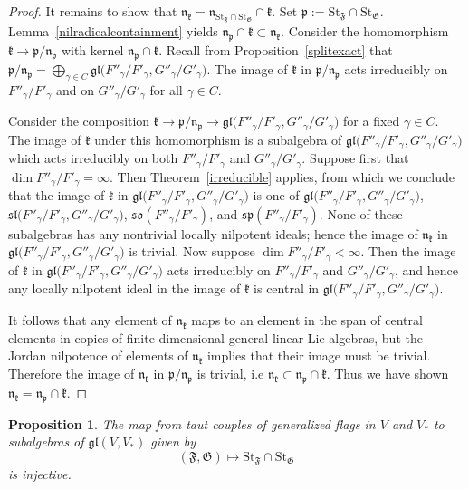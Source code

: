 \documentclass{article}
\newcommand {\St} {\mathrm{St}}
\def\gl{\mathfrak {gl}}
\def\n{\mathfrak {n}}
\def\p{\mathfrak {p}}
\def\sl{\mathfrak{sl}}
\def\so{\mathfrak{so}}
\def\sp{\mathfrak{sp}}
\def\k{\mathfrak{k}}
\def\F{\mathfrak{F}}
\def\G{\mathfrak{G}}
\newtheorem{prop}[thm]{Proposition}
\begin{document}
\begin{proof}
It remains to show that $\n_\k = \n_{\St_\F \cap \St_\G} \cap \k$.
Set $\p := \St_\F \cap \St_\G$.   Lemma~\ref{nilradicalcontainment} yields $\n_\p \cap \k \subset \n_\k$.  Consider the homomorphism $\k \rightarrow {\p} / {\n_\p}$ with kernel $\n_ \p \cap \k$.  Recall from Proposition~\ref{splitexact} that ${\p} / {\n_\p} = \bigoplus_{\gamma \in C} \gl\big({F''_\gamma} / {F'_\gamma} , {G''_\gamma} / {G'_\gamma}\big)$.  The image of $\k$ in ${\p} / {\n_\p}$ acts irreducibly on ${F''_\gamma} / {F'_\gamma}$ and on ${G''_\gamma} / {G'_\gamma}$ for all $\gamma \in C$.  

Consider the composition $\k \rightarrow {\p} / {\n_\p} \rightarrow \gl\big({F''_\gamma} / {F'_\gamma} , {G''_\gamma} / {G'_\gamma}\big)$ for a fixed $\gamma \in C$.  The image of $\k$ under this homomorphism  is a subalgebra of $ \gl\big({F''_\gamma} / {F'_\gamma} , {G''_\gamma} / {G'_\gamma}\big)$ which acts irreducibly on both ${F''_\gamma} / {F'_\gamma}$ and ${G''_\gamma} / {G'_\gamma}$.  
Suppose first that $\dim {F''_\gamma} / {F'_\gamma} = \infty$.  Then Theorem~\ref{irreducible} applies, from which we conclude that the image of $\k$ in $\gl\big({F''_\gamma} / {F'_\gamma} , {G''_\gamma} / {G'_\gamma}\big)$ is one of $\gl\big({F''_\gamma} / {F'_\gamma} , {G''_\gamma} / {G'_\gamma}\big)$, $\sl \big({F''_\gamma} / {F'_\gamma} , {G''_\gamma} / {G'_\gamma} \big)$, $\so({F''_\gamma} / {F'_\gamma})$, and $\sp({F''_\gamma} / {F'_\gamma})$.  None of these subalgebras has any nontrivial locally nilpotent ideals; hence the image of $\n_\k$ in $\gl\big({F''_\gamma} / {F'_\gamma} , {G''_\gamma} / {G'_\gamma}\big)$ is trivial.  Now suppose $\dim {F''_\gamma} / {F'_\gamma} < \infty$.  Then the image of $\k$ in $\gl\big({F''_\gamma} / {F'_\gamma} , {G''_\gamma} / {G'_\gamma}\big)$  acts irreducibly on ${F''_\gamma} / {F'_\gamma}$ and ${G''_\gamma} / {G'_\gamma}$, and hence any locally nilpotent ideal in the image of $\k$ is central in $\gl\big({F''_\gamma} / {F'_\gamma} , {G''_\gamma} / {G'_\gamma}\big)$.  

It follows that any element of $\n_\k$ maps to an element in the span of central elements in copies of finite-dimensional general linear Lie algebras, but the Jordan nilpotence of elements of $\n_\k$ implies that their image must be trivial.
Therefore the image of $\n_\k$ in ${\p} / {\n_\p}$ is trivial, i.e $\n_\k \subset \n_\p \cap \k$.  Thus we have shown $\n_\k = \n_\p \cap \k$.
\end{proof}


\begin{prop} \label{uniquetautpair}
The map from taut couples of generalized flags in $V$ and $V_*$ to subalgebras of $\gl(V,V_*)$ given by $$(\F,\G) \mapsto \St_\F \cap \St_\G$$ is injective. 
\end{prop}
\end{document}

